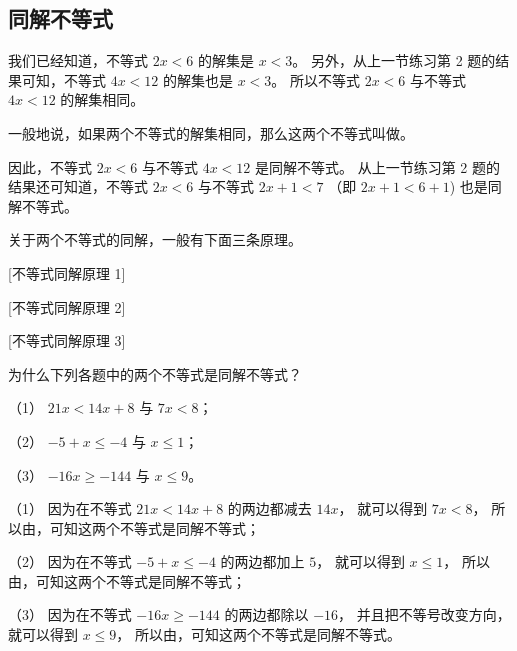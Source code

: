 \subsection{同解不等式}\label{subsec:4-3}

我们已经知道，不等式 $2x < 6$ 的解集是 $x < 3$。
另外，从上一节练习第 2 题的结果可知，不等式 $4x < 12$ 的解集也是 $x < 3$。
所以不等式 $2x < 6$ 与不等式 $4x < 12$ 的解集相同。

一般地说，如果两个不等式的解集相同，那么这两个不等式叫做。

因此，不等式 $2x < 6$ 与不等式 $4x < 12$ 是同解不等式。
从上一节练习第 2 题的结果还可知道，不等式 $2x < 6$ 与不等式 $2x + 1 < 7$ （即 $2x + 1< 6 + 1$) 也是同解不等式。

关于两个不等式的同解，一般有下面三条原理。

[不等式同解原理 1]

[不等式同解原理 2]

[不等式同解原理 3]

\liti[0] 为什么下列各题中的两个不等式是同解不等式？

（1） $21x < 14x + 8$ 与 $7x < 8$；

（2） $-5 + x \leqslant -4$ 与 $x \leqslant 1$；

（3） $-16x \geqslant -144$ 与 $x \leqslant 9$。

\jie （1） 因为在不等式 $21x < 14x + 8$ 的两边都减去 $14x$， 就可以得到  $7x < 8$，
所以由，可知这两个不等式是同解不等式；

（2） 因为在不等式 $-5 + x \leqslant -4$ 的两边都加上 $5$， 就可以得到 $x \leqslant 1$，
所以由，可知这两个不等式是同解不等式；

（3） 因为在不等式 $-16x \geqslant -144$ 的两边都除以 $-16$， 并且把不等号改变方向，就可以得到 $x \leqslant 9$，
所以由，可知这两个不等式是同解不等式。

